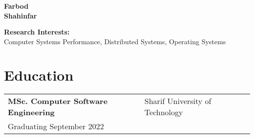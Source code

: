 \documentclass[11pt]{article}
\makeatletter
\newcommand{\eduSmall}[4] {
    \begin{table}[h!]
        \begin{tabular*}{\textwidth}{ll@{\extracolsep{\fill}}r}
            \textbf{#1} &  #2 & \\ %
            #3 &  &
        \end{tabular*}
    \end{table}
    }
\makeatother
\begin{document}
{
    \begin{minipage}[t]{3.5cm}
        \vspace{8mm}
        \noindent
        \huge\bfseries
        Farbod\\
        Shahinfar
        \vspace{0.0cm}
    \end{minipage}
    \null\hfill
    \begin{minipage}[t]{0.5\textwidth}
        
    \end{minipage}

}



%

\noindent\textbf{Research Interests:} \\
\indent Computer Systems Performance, Distributed Systems, Operating Systems


\section{Education}
\eduSmall{MSc. Computer Software Engineering}{Sharif University of Technology}{Graduating September 2022}{images/sharif.png}
\vspace{-5mm}
\end{document}
